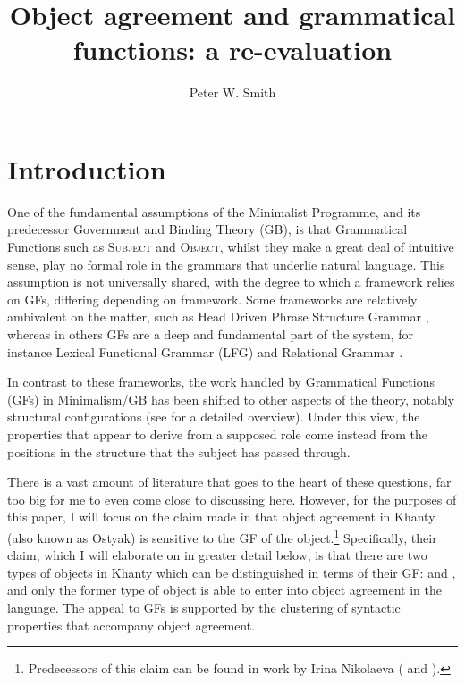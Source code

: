 \documentclass[output=paper
,modfonts
,nonflat]{langsci/langscibook}
\title{Object agreement and grammatical functions: a re-evaluation}
\author{Peter W. Smith\affiliation{Goethe-Universität, Frankfurt}}
\begin{document}
\maketitle



\section{Introduction} 

One of the fundamental assumptions of the Minimalist Programme, and its predecessor Government and Binding Theory (GB), is that Grammatical Functions such as \textsc{Subject} and \textsc{Object}, whilst they make a great deal of intuitive sense, play no formal role in the grammars that underlie natural language.
This assumption is not universally shared, with the degree to which a framework relies on GFs, differing depending on framework.
Some frameworks are relatively ambivalent on the matter, such as Head Driven Phrase Structure Grammar \citep{pollardsag1994}, whereas in others GFs are a deep and fundamental part of the system, for instance Lexical Functional Grammar (LFG) \citep{dalrymple2001} and Relational Grammar \citep{perlmutterpostal1983}. 

In contrast to these frameworks, the work handled by Grammatical Functions (GFs) in Minimalism/GB has been shifted to other aspects of the theory, notably structural configurations (see \citealt{mccloskey1997} for a detailed overview).
Under this view, the properties that appear to derive from a supposed \subj {} role come instead from the positions in the structure that the subject has passed through.

There is a vast amount of literature that goes to the heart of these questions, far too big for me to even come close to discussing here. However, for the purposes of this paper, I will focus on the claim made in \citet{dn2011} that object agreement in Khanty (also known as Ostyak) is sensitive to the GF of the object.\footnote{Predecessors of this claim can be found in work by Irina Nikolaeva (\citealt{nikolaeva1999,ostyakgrammar} and \citealt{nikolaeva2001}).} 
Specifically, their claim, which I will elaborate on in greater detail below, is that there are two types of objects in Khanty which can be distinguished in terms of their GF: \object {} and \robj, and only the former type of object is able to enter into object agreement in the language.
The appeal to GFs is supported by the clustering of syntactic properties that accompany object agreement.
\end{document}
